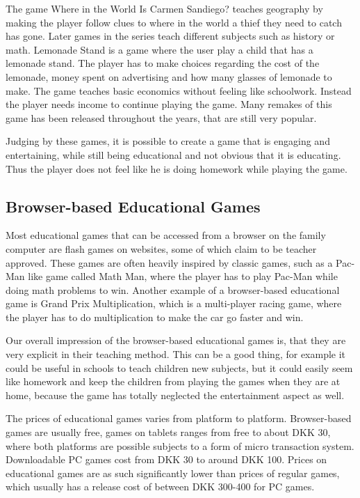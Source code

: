 The game Where in the World Is Carmen Sandiego? teaches geography by making the player follow clues to where in the world a thief they need to catch has gone.
Later games in the series teach different subjects such as history or math.
Lemonade Stand is a game where the user play a child that has a lemonade stand.
The player has to make choices regarding the cost of the lemonade, money spent on advertising and how many glasses of lemonade to make.
The game teaches basic economics without feeling like schoolwork. Instead the player needs income to continue playing the game.
Many remakes of this game has been released throughout the years, that are still very popular.

Judging by these games, it is possible to create a game that is engaging and entertaining, while still being educational and not obvious that it is educating. Thus the player does not feel like he is doing homework while playing the game.

\subsection{Browser-based Educational Games}
Most educational games that can be accessed from a browser on the family computer are flash games on websites, some of which claim to be teacher 
approved.
These games are often heavily inspired by classic games, such as a Pac-Man like game called Math Man, where the player has to play Pac-Man while doing 
math problems to win.\cite{mathman} Another example of a browser-based educational game is Grand Prix Multiplication, which is a multi-player racing 
game, where the player has to do multiplication to make the car go faster and win.\cite{grandprix}\newline

Our overall impression of the browser-based educational games is, that they are very explicit in their teaching method.
This can be a good thing, for example it could be useful in schools to teach children new subjects, but it could easily seem like homework and keep the children from playing the games when they are at home, because the game has totally neglected the entertainment aspect as well.\newline

The prices of educational games varies from platform to platform. 
Browser-based games are usually free, games on tablets ranges from free to about DKK 30, where both platforms are possible subjects to a form of micro transaction system.
Downloadable PC games cost from DKK 30 to around DKK 100.
Prices on educational games are as such significantly lower than prices of regular games, which usually has a release cost of between DKK 300-400 for PC games.

